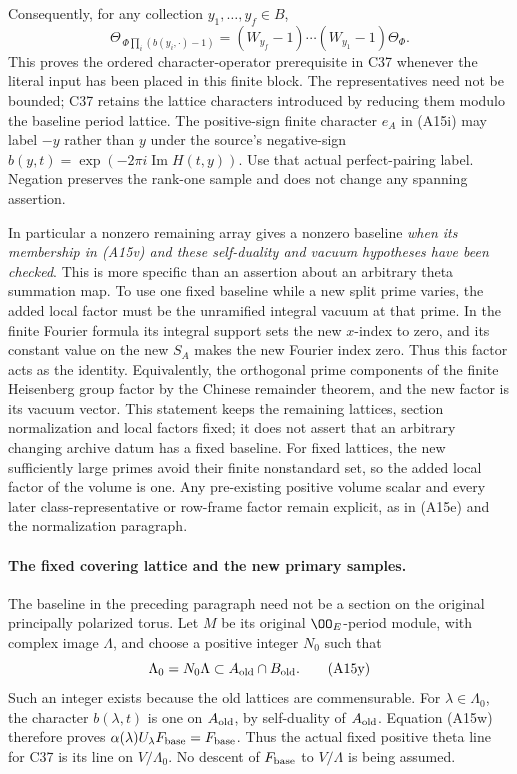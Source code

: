 Consequently, for any collection $y_1,\ldots,y_f\in B$,
\[
 \Theta_{\,\Phi\prod_i(b(y_i,\cdot)-1)}
      =(W_{y_f}-1)\cdots(W_{y_1}-1)\Theta_\Phi.
 \tag{A15x}
\]
This proves the ordered character-operator prerequisite in C37
whenever the literal input has been placed in this finite block.
The representatives need not be bounded; C37 retains the lattice
characters introduced by reducing them modulo the baseline period
lattice.  The positive-sign finite character $e_A$ in (A15i) may
label $-y$ rather than $y$ under the source's negative-sign
$b(y,t)=\exp(-2\pi i\operatorname{Im}H(t,y))$.
Use that actual perfect-pairing label.  Negation preserves the
rank-one sample and does not change any spanning assertion.

In particular a nonzero remaining array gives a nonzero baseline
\emph{when its membership in (A15v) and these self-duality and
vacuum hypotheses have been checked}.  This is more specific than
an assertion about an arbitrary theta summation map.  To use one
fixed baseline while a new split prime varies, the added local
factor must be the unramified integral vacuum at that prime.
In the finite Fourier formula its integral support sets the new
$x$-index to zero, and its constant value on the new $S_A$ makes
the new Fourier index zero.  Thus this factor acts as the identity.
Equivalently, the orthogonal prime components of the finite
Heisenberg group factor by the Chinese remainder theorem, and
the new factor is its vacuum vector.  This statement keeps the
remaining lattices, section normalization and local factors fixed;
it does not assert that an arbitrary changing archive datum has a
fixed baseline.  For fixed lattices, the new sufficiently large
primes avoid their finite nonstandard set, so the added local
factor of the volume is one.  Any pre-existing positive volume
scalar and every later class-representative or row-frame factor
remain explicit, as in (A15e) and the normalization paragraph.

\paragraph{The fixed covering lattice and the new primary samples.}
The baseline in the preceding paragraph need not be a section on
the original principally polarized torus.  Let $M$ be its original
$\OO_E$-period module, with complex image $\Lambda$, and choose a
positive integer $N_0$ such that
\[
 \Lambda_0=N_0\Lambda\subset A_{\rm old}\cap B_{\rm old}.
 \tag{A15y}
\]
Such an integer exists because the old lattices are commensurable.
For $\lambda\in\Lambda_0$, the character $b(\lambda,t)$ is one
on $A_{\rm old}$, by self-duality of $A_{\rm old}$.
Equation (A15w) therefore proves
$\alpha(\lambda)U_\lambda F_{\rm base}=F_{\rm base}$.
Thus the actual fixed positive theta line for C37 is its line on
$V/\Lambda_0$.  No descent of $F_{\rm base}$ to $V/\Lambda$
is being assumed.

